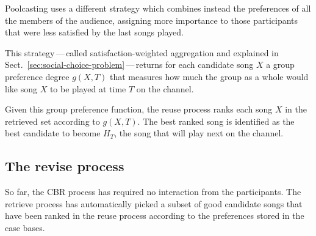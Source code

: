 Poolcasting uses a different strategy which combines instead the preferences of all the members of the audience, assigning more importance to those participants that were less satisfied by the last songs played.

This strategy\,---\,called satisfaction-weighted aggregation and explained in Sect.~\ref{sec:social-choice-problem}\,---\,returns for each candidate song $X$ a group preference degree $g(X,T)$ that measures how much the group as a whole would like song $X$ to be played at time $T$ on the channel.

Given this group preference function, the reuse process ranks each song $X$ in the retrieved set according to $g(X,T)$.
The best ranked song is identified as the best candidate to become $H_T$, the song that will play next on the channel.

% 
% 
% 
% 
 
\subsection{The revise process} %
\label{sub:the_revise_process2}

So far, the CBR process has required no interaction from the participants.
The retrieve process has automatically picked a subset of good candidate songs that have been ranked in the reuse process according to the preferences stored in the case bases. %

